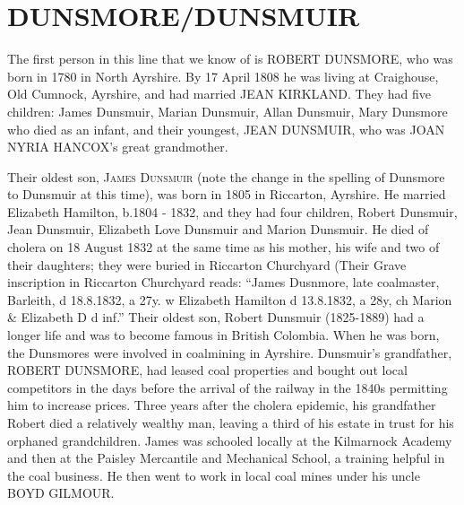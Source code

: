 \section{DUNSMORE/DUNSMUIR}

The first person in this line that we know of is \uppercase{Robert Dunsmore}, who was born in 1780 in North Ayrshire.  By	
17 April 1808 he was living at Craighouse, Old Cumnock, Ayrshire, and had married \uppercase{Jean Kirkland}.  They had five children: James Dunsmuir, Marian Dunsmuir, Allan Dunsmuir, Mary Dunsmore who died as an infant, and  their youngest, \uppercase{Jean Dunsmuir}, who was  \uppercase{Joan Nyria Hancox}'s great grandmother.

Their oldest son, \textsc{James Dunsmuir} (note the change in the spelling of Dunsmore to Dunsmuir at this time), was born in	1805 in Riccarton, Ayrshire. He married Elizabeth Hamilton, b.1804 - 1832, and they had four children, Robert Dunsmuir, Jean Dunsmuir, Elizabeth Love Dunsmuir and Marion Dunsmuir. He died of cholera on 18 August 1832 at the same time as his mother, his wife and two of their daughters; they were buried in Riccarton Churchyard (Their Grave inscription in Riccarton Churchyard reads: ``James Dusnmore, late coalmaster, Barleith, d 18.8.1832, a 27y. w Elizabeth Hamilton d 13.8.1832, a 28y, ch Marion \& Elizabeth D d inf.'' Their oldest son, Robert Dunsmuir (1825-1889) had a longer life and was to become famous in British Colombia.  When he was born, the Dunsmores were involved in coalmining in Ayrshire. Dunsmuir's grandfather, \uppercase{Robert Dunsmore}, had leased coal properties and bought out local competitors in the days before the arrival of the railway in the 1840s permitting him to increase prices.  Three years after the cholera epidemic, his grandfather Robert died a relatively wealthy man, leaving a third of his estate in trust for his orphaned grandchildren. James was schooled locally at the Kilmarnock Academy and then at the Paisley Mercantile and Mechanical School, a training helpful in the coal business. He then went to work in local coal mines under his uncle \uppercase{Boyd Gilmour}.
